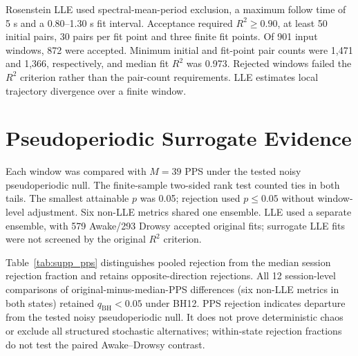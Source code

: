 \documentclass[conference,a4paper]{IEEEtran}
\begin{document}
Rosenstein LLE used spectral-mean-period exclusion, a maximum follow time of 5 s and a 0.80--1.30 s fit interval. Acceptance required $R^2\geq0.90$, at least 50 initial pairs, 30 pairs per fit point and three finite fit points. Of 901 input windows, 872 were accepted. Minimum initial and fit-point pair counts were 1,471 and 1,366, respectively, and median fit $R^2$ was 0.973. Rejected windows failed the $R^2$ criterion rather than the pair-count requirements. LLE estimates local trajectory divergence over a finite window.

\section{Pseudoperiodic Surrogate Evidence}\label{sec:supp_5}
Each window was compared with $M=39$ PPS under the tested noisy pseudoperiodic null. The finite-sample two-sided rank test counted ties in both tails. The smallest attainable $p$ was 0.05; rejection used $p\leq0.05$ without window-level adjustment. Six non-LLE metrics shared one ensemble. LLE used a separate ensemble, with 579 Awake/293 Drowsy accepted original fits; surrogate LLE fits were not screened by the original $R^2$ criterion.

Table~\ref{tab:supp_pps} distinguishes pooled rejection from the median session rejection fraction and retains opposite-direction rejections. All 12 session-level comparisons of original-minus-median-PPS differences (six non-LLE metrics in both states) retained $q_{\mathrm{BH}}<0.05$ under BH12. PPS rejection indicates departure from the tested noisy pseudoperiodic null. It does not prove deterministic chaos or exclude all structured stochastic alternatives; within-state rejection fractions do not test the paired Awake--Drowsy contrast.
\end{document}
